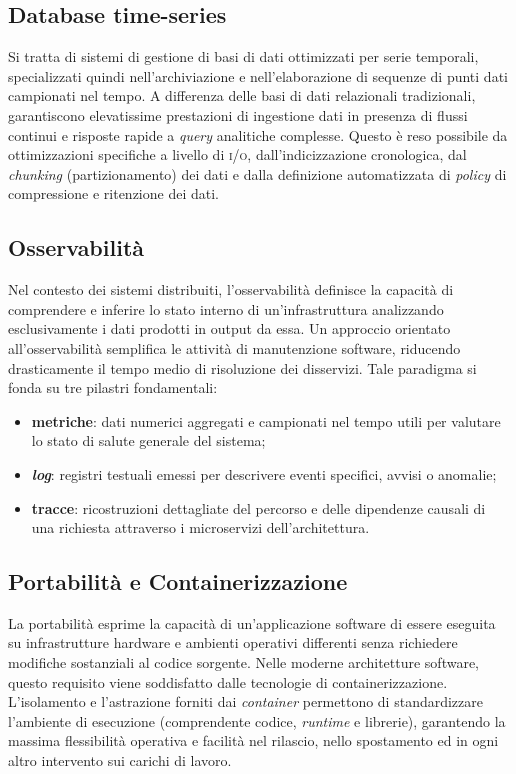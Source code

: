 \documentclass[12pt]{article}
\begin{document}
    \subsection{Database time-series}
    
    Si tratta di sistemi di gestione di basi di dati ottimizzati per serie temporali, specializzati quindi nell'archiviazione e nell'elaborazione di sequenze di punti dati campionati nel tempo. 
    A differenza delle basi di dati relazionali tradizionali, garantiscono elevatissime prestazioni di ingestione dati in presenza di flussi continui e risposte rapide a \textit{query} analitiche complesse. Questo è reso possibile da ottimizzazioni specifiche a livello di \textsc{i/o}, dall'indicizzazione cronologica, dal \textit{chunking} (partizionamento) dei dati e dalla definizione automatizzata di \textit{policy} di compressione e ritenzione dei dati.
    
    \subsection{Osservabilità}
    
    Nel contesto dei sistemi distribuiti, l'osservabilità definisce la capacità di comprendere e inferire lo stato interno di un'infrastruttura analizzando esclusivamente i dati prodotti in output da essa. 
    Un approccio orientato all'osservabilità semplifica le attività di manutenzione software, riducendo drasticamente il tempo medio di risoluzione dei disservizi. Tale paradigma si fonda su tre pilastri fondamentali:
    \begin{itemize}
        \item \textbf{metriche}: dati numerici aggregati e campionati nel tempo utili per valutare lo stato di salute generale del sistema;
        \item \textbf{\textit{log}}: registri testuali emessi per descrivere eventi specifici, avvisi o anomalie;
        \item \textbf{tracce}: ricostruzioni dettagliate del percorso e delle dipendenze causali di una richiesta attraverso i microservizi dell'architettura.
    \end{itemize}
    
    \subsection{Portabilità e Containerizzazione}
    
    La portabilità esprime la capacità di un'applicazione software di essere eseguita su infrastrutture hardware e ambienti operativi differenti senza richiedere modifiche sostanziali al codice sorgente. 
    Nelle moderne architetture software, questo requisito viene soddisfatto dalle tecnologie di containerizzazione. L'isolamento e l'astrazione forniti dai \textit{container} permettono di standardizzare l'ambiente di esecuzione (comprendente codice, \textit{runtime} e librerie), garantendo la massima flessibilità operativa e facilità nel rilascio, nello spostamento ed in ogni altro intervento sui carichi di lavoro.
    
\end{document}
